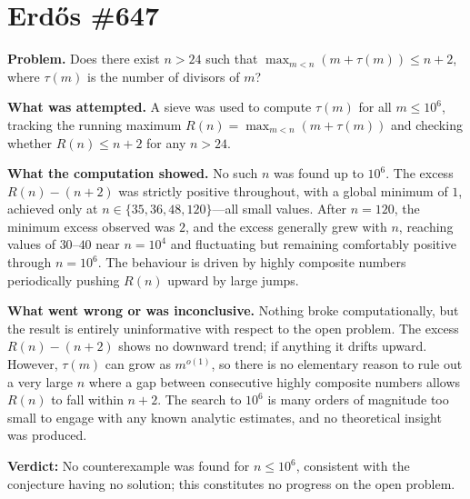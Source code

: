 \section{Erdős \#647}

\textbf{Problem.} Does there exist $n > 24$ such that $\max_{m < n}(m + \tau(m)) \leq n + 2$, where $\tau(m)$ is the number of divisors of $m$?

\textbf{What was attempted.} A sieve was used to compute $\tau(m)$ for all $m \leq 10^6$, tracking the running maximum $R(n) = \max_{m < n}(m + \tau(m))$ and checking whether $R(n) \leq n + 2$ for any $n > 24$.

\textbf{What the computation showed.} No such $n$ was found up to $10^6$. The excess $R(n) - (n+2)$ was strictly positive throughout, with a global minimum of $1$, achieved only at $n \in \{35, 36, 48, 120\}$---all small values. After $n = 120$, the minimum excess observed was $2$, and the excess generally grew with $n$, reaching values of $30$--$40$ near $n = 10^4$ and fluctuating but remaining comfortably positive through $n = 10^6$. The behaviour is driven by highly composite numbers periodically pushing $R(n)$ upward by large jumps.

\textbf{What went wrong or was inconclusive.} Nothing broke computationally, but the result is entirely uninformative with respect to the open problem. The excess $R(n) - (n+2)$ shows no downward trend; if anything it drifts upward. However, $\tau(m)$ can grow as $m^{o(1)}$, so there is no elementary reason to rule out a very large $n$ where a gap between consecutive highly composite numbers allows $R(n)$ to fall within $n+2$. The search to $10^6$ is many orders of magnitude too small to engage with any known analytic estimates, and no theoretical insight was produced.

\textbf{Verdict:} No counterexample was found for $n \leq 10^6$, consistent with the conjecture having no solution; this constitutes no progress on the open problem.